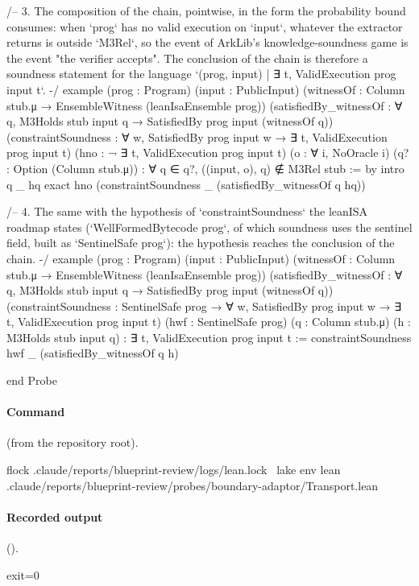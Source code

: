 \begin{leancode}[numbers=left,numbersep=3pt]
/-- 3. The composition of the chain, pointwise, in the form the probability bound consumes:
when `prog` has no valid execution on `input`, whatever the extractor returns is outside
`M3Rel`, so the event of ArkLib's knowledge-soundness game is the event "the verifier accepts".
The conclusion of the chain is therefore a soundness statement for the language
`{(prog, input) | ∃ t, ValidExecution prog input t}`. -/
example (prog : Program) (input : PublicInput)
    (witnessOf : Column stub.μ → EnsembleWitness (leanIsaEnsemble prog))
    (satisfiedBy_witnessOf :
      ∀ q, M3Holds stub input q → SatisfiedBy prog input (witnessOf q))
    (constraintSoundness :
      ∀ w, SatisfiedBy prog input w → ∃ t, ValidExecution prog input t)
    (hno : ¬ ∃ t, ValidExecution prog input t) (o : ∀ i, NoOracle i)
    (q? : Option (Column stub.μ)) :
    ∀ q ∈ q?, ((input, o), q) ∉ M3Rel stub := by
  intro q _ hq
  exact hno (constraintSoundness _ (satisfiedBy_witnessOf q hq))

/-- 4. The same with the hypothesis of `constraintSoundness` the leanISA roadmap states
(`WellFormedBytecode prog`, of which soundness uses the sentinel field, built as
`SentinelSafe prog`): the hypothesis reaches the conclusion of the chain. -/
example (prog : Program) (input : PublicInput)
    (witnessOf : Column stub.μ → EnsembleWitness (leanIsaEnsemble prog))
    (satisfiedBy_witnessOf :
      ∀ q, M3Holds stub input q → SatisfiedBy prog input (witnessOf q))
    (constraintSoundness :
      SentinelSafe prog → ∀ w, SatisfiedBy prog input w → ∃ t, ValidExecution prog input t)
    (hwf : SentinelSafe prog)
    (q : Column stub.μ) (h : M3Holds stub input q) : ∃ t, ValidExecution prog input t :=
  constraintSoundness hwf _ (satisfiedBy_witnessOf q h)

end Probe
\end{leancode}

\paragraph{Command} (from the repository root).
\begin{shellcode}
flock .claude/reports/blueprint-review/logs/lean.lock \
  lake env lean .claude/reports/blueprint-review/probes/boundary-adaptor/Transport.lean
\end{shellcode}

\paragraph{Recorded output} ().
\begin{srccode}[numbers=left,numbersep=3pt]
exit=0
\end{srccode}

